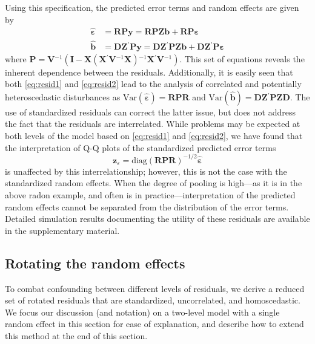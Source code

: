 \documentclass[12pt]{article} %
\newcommand{\inv}{\ensuremath{^{-1}}}
\newcommand{\trans}{\ensuremath{^\prime}}
\newcommand{\var}{\ensuremath{\mathrm{Var}}}
\begin{document}
Using this specification, the predicted error terms and random effects are given by 
%
\begin{align}
\widehat{\bm{\varepsilon}} &= \bm{RPy} = \bm{RPZb} + \bm{RP \varepsilon} \label{eq:resid1}\\
\widehat{\bm{b}} &= \bm{DZ}\trans \bm{Py} = \bm{DZ}\trans \bm{PZb} + \bm{DZ}\trans \bm{P \varepsilon} \label{eq:resid2}
\end{align}
%
where $\bm{P} = \bm{V}\inv( \bm{I} - \bm{X} (\bm{X}\trans \bm{V}\inv \bm{X})\inv \bm{X}\trans \bm{V}\inv)$. This  set of equations %
reveals the inherent dependence between the residuals.
Additionally, it is easily seen that both \eqref{eq:resid1} and \eqref{eq:resid2} lead to the analysis of correlated and potentially heteroscedastic disturbances as $\var(\widehat{\bm{\varepsilon}}) = \bm{RPR}$ and $\var(\widehat{\bm{b}}) = \bm{DZ}\trans \bm{PZD}$.
The use of standardized residuals can correct the latter issue, but does not address the fact that the residuals are interrelated. While problems may be expected at both levels of the model based on \eqref{eq:resid1} and \eqref{eq:resid2}, we have found that the interpretation of Q-Q plots of the standardized predicted error terms
%
\[
\bm{z}_{\varepsilon} =  \text{diag} \left(\bm{RPR} \right)^{-1/2} \widehat{\bm{\varepsilon}}
\]
%
is unaffected by this interrelationship; however, this is not the case with the standardized random effects.  When the degree of pooling is high---as it is in the above radon example, and often is in practice---interpretation of the predicted random effects cannot be separated from the distribution of the error terms. Detailed simulation results documenting the utility of  these residuals are available in the supplementary material.



\subsection{Rotating the random effects}\label{sec:rotate}

To combat  confounding between different  levels of residuals, we derive a reduced set of rotated residuals that are standardized, uncorrelated, and homoscedastic. We focus our discussion (and notation) on a two-level model with a single random effect in this section for ease of explanation, and describe how to extend this method at the end of this section.
\end{document}
